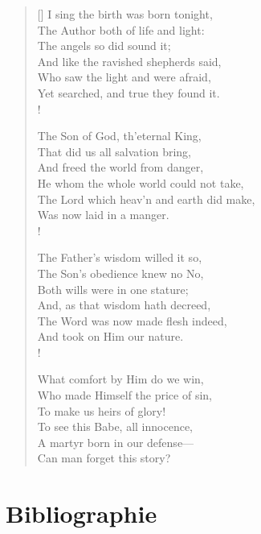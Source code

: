 \documentclass[a4paper,11pt,open=any]{scrbook}
\newcommand{\attrib}[1]{%
\nopagebreak{\raggedleft\footnotesize #1\par}}
\begin{document}
\begin{appendices}
 \settowidth{\versewidth}{And like the ravished shepherds said,}
 \begin{verse}[\versewidth]
  I sing the birth was born tonight, \\
  The Author both of life and light: \\
  \vin The angels so did sound it; \\
  And like the ravished shepherds said, \\
  Who saw the light and were afraid, \\
  \vin Yet searched, and true they found it. \\!

  The Son of God, th’eternal King, \\
  That did us all salvation bring, \\
  \vin And freed the world from danger, \\
  He whom the whole world could not take, \\
  The Lord which heav’n and earth did make, \\
  \vin Was now laid in a manger. \\!

  The Father’s wisdom willed it so, \\
  The Son’s obedience knew no No, \\
  \vin Both wills were in one stature; \\
  And, as that wisdom hath decreed, \\
  The Word was now made flesh indeed, \\
  \vin And took on Him our nature. \\!

  What comfort by Him do we win, \\
  Who made Himself the price of sin, \\
  \vin To make us heirs of glory! \\
  To see this Babe, all innocence, \\
  A martyr born in our defense— \\
  \vin Can man forget this story? \\
  \attrib{Ben Jonson (1572/3–1637)}
 \end{verse}


\chapter{Bibliographie}

\printbibliography[title={Quellen},heading=subbibliography,category={src}]
\printbibliography[title={Literatur},heading=subbibliography,category={lit}]

\end{appendices}
\end{document}
